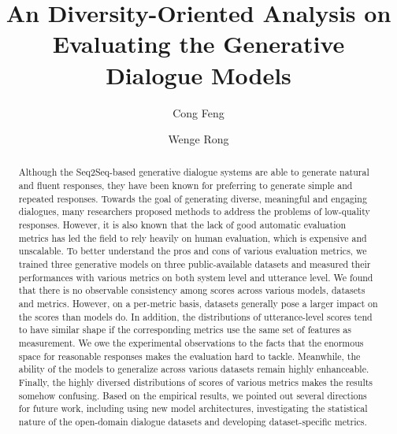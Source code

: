 \documentclass[runningheads]{llncs}
\begin{document}
\title{An Diversity-Oriented Analysis on Evaluating the Generative Dialogue Models}
%
%
\author{Cong Feng \and Wenge Rong}
%
%
%
%
\maketitle
%
\begin{abstract}
    Although the Seq2Seq-based generative dialogue systems are
    able to generate natural and
    fluent responses,
    they have been known for preferring to generate
    simple and repeated responses.
    Towards the goal of generating diverse, meaningful and
    engaging dialogues,
    many researchers proposed methods to address the
    problems of low-quality responses.
    However, it is also known that the
    lack of good automatic evaluation metrics
    has led the field to rely heavily on human evaluation,
    which is expensive and unscalable.
    To better understand the pros and cons of various
    evaluation metrics,
    we trained three generative models on
    three public-available datasets and measured their
    performances with various metrics on both system level
    and utterance level.
    We found that there is no observable consistency among scores
    across various models, datasets and metrics.
    However, on a per-metric basis, datasets generally pose a larger impact on
    the scores than models do.
    In addition, the distributions of
    utterance-level scores tend to have similar shape if the corresponding metrics
    use the same set of features as measurement.
    We owe the experimental observations to the facts
    that the enormous space for reasonable responses
    makes the evaluation hard to tackle.
    Meanwhile, the ability of the models to generalize across
    various datasets remain highly enhanceable.
    Finally, the highly diversed distributions of scores
    of various metrics makes the results somehow confusing.
    Based on the empirical results, we pointed out several
    directions for future work, including using new model
    architectures, investigating the statistical nature of
    the open-domain dialogue datasets and
    developing dataset-specific metrics.
\keywords{}
\end{abstract}
%
%
\end{document}
